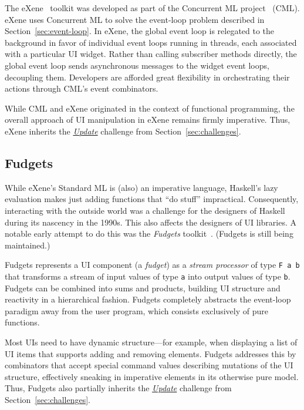 \documentclass[sigplan,screen]{acmart}
\begin{document}
The eXene~\cite{eXene} toolkit was developed as part of the Concurrent
ML project~\cite{ConcurrentML} (CML).  eXene
uses Concurrent ML to solve the event-loop problem described in
Section~\ref{sec:event-loop}.  In eXene, the global event loop is
relegated to the background in favor of individual event loops running
in threads, each associated with a particular UI widget.  Rather than calling
subscriber methods directly, the global event loop sends asynchronous
messages to the widget event loops, decoupling them.  Developers
are afforded great flexibility in orchestrating their
actions through CML's event combinators.

While CML and eXene originated in the context of functional
programming, the overall approach of UI manipulation in eXene remains
firmly imperative.  Thus, eXene inherits the \hyperlink{challenge:update}{\textit{Update}} challenge from Section~\ref{sec:challenges}.

\subsection{Fudgets}

While eXene's Standard ML is (also) an imperative language,
Haskell's lazy evaluation makes just adding functions that ``do
stuff'' impractical.  Consequently, interacting with the outside world
was a challenge for the designers of Haskell during its
nascency in the 1990s.  This also affects the designers of UI
libraries.  A notable early attempt to do this was the
\textit{Fudgets} toolkit~\cite{Fudgets}.  (Fudgets is still being maintained.)

Fudgets represents a UI component (a \textit{fudget}) as a
\textit{stream processor} of type \verb|F a b| that transforms a
stream of input values of type \texttt{a} into output values of type
\texttt{b}.  Fudgets can be combined into sums and products, building
UI structure and reactivity in a hierarchical fashion.  Fudgets
completely abstracts the event-loop paradigm away from the user
program, which consists exclusively of pure functions.

Most UIs
need to have dynamic structure---for example, when
displaying a list of UI items that supports adding and removing
elements.  Fudgets addresses this by combinators that accept special
command values describing mutations of the UI structure,
effectively sneaking in imperative elements in its otherwise pure
model.  Thus, Fudgets also partially inherits the \hyperlink{challenge:update}{\textit{Update}} challenge from
Section~\ref{sec:challenges}.
\end{document}
